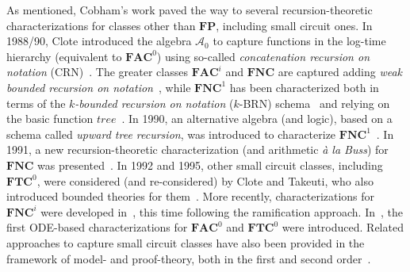 \documentclass[11pt, oneside]{article}
\newcommand{\FP}{\mathbf{FP}}
\newcommand{\NC}{\mathbf{FNC}}
\newcommand{\AC}{\mathbf{FAC}}
\newcommand{\TC}{\mathbf{FTC}}
\theoremstyle{definition}
\begin{document}
    As mentioned, Cobham's work paved the way to several recursion-theoretic characterizations for classes other than $\FP$, including small circuit ones.
    In 1988/90, Clote introduced the algebra $\mathcal{A}_0$ to capture functions in the log-time hierarchy (equivalent to $\AC^0$) using so-called \emph{concatenation recursion on notation} (CRN)~\cite{Clote88,Clote1990}.
    The greater classes $\AC^i$ and $\NC$ are captured adding \emph{weak bounded recursion on notation}~\cite{Clote1990}, while
    $\NC^1$ has been characterized both in terms of the \emph{$k$-bounded recursion on notation} ($k$-BRN) schema~\cite{Clote93} and relying on the basic function $tree$~\cite{Clote1990}.
    In 1990, an alternative algebra (and logic), based on a schema called \emph{upward tree recursion}, was introduced to characterize $\NC^1$~\cite{ComptonLaflamme}.
    In 1991, a new recursion-theoretic characterization (and arithmetic \emph{\`a la Buss}) for $\NC$ was presented~\cite{Allen}.
    In 1992 and 1995, other small circuit classes, including $\TC^0$, were considered (and re-considered) by Clote and Takeuti, who also introduced bounded theories for them~\cite{CloteTakeuti92,CloteTakeuti}.
    More recently, characterizations for $\NC^i$ were developed in~\cite{BonfanteKahleMarionOitavem}, this time following the ramification approach. 
    In~\cite{ADK24a}, the first ODE-based characterizations for $\AC^0$ and $\TC^0$ were introduced. 
    Related approaches to capture small circuit classes have also been provided in the framework of model- and proof-theory, both in the first and second order~\cite{Immerman,BarringtonImmermanStraubing,GurevichLewis,Lindell,ComptonLaflamme,Allen,CloteTakeuti92,CloteTakeuti,Johannsen,CookNguyen,Arai,CookMorioka,DurandHaakVollmer}.
\end{document}
